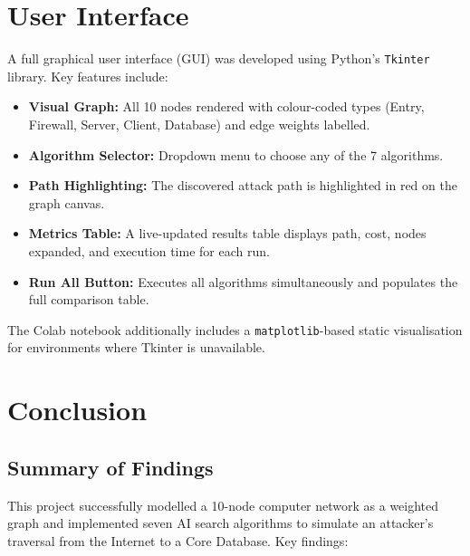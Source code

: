 \documentclass[12pt,a4paper]{article}
\begin{document}
\section{User Interface}

A full graphical user interface (GUI) was developed using Python's \texttt{Tkinter}
library. Key features include:

\begin{itemize}
    \item \textbf{Visual Graph:} All 10 nodes rendered with colour-coded types (Entry,
    Firewall, Server, Client, Database) and edge weights labelled.
    \item \textbf{Algorithm Selector:} Dropdown menu to choose any of the 7 algorithms.
    \item \textbf{Path Highlighting:} The discovered attack path is highlighted in red
    on the graph canvas.
    \item \textbf{Metrics Table:} A live-updated results table displays path,
    cost, nodes expanded, and execution time for each run.
    \item \textbf{Run All Button:} Executes all algorithms simultaneously and populates
    the full comparison table.
\end{itemize}

The Colab notebook additionally includes a \texttt{matplotlib}-based static
visualisation for environments where Tkinter is unavailable.

\section{Conclusion}

\subsection{Summary of Findings}

This project successfully modelled a 10-node computer network as a weighted graph and
implemented seven AI search algorithms to simulate an attacker's traversal from the
Internet to a Core Database. Key findings:
\end{document}
